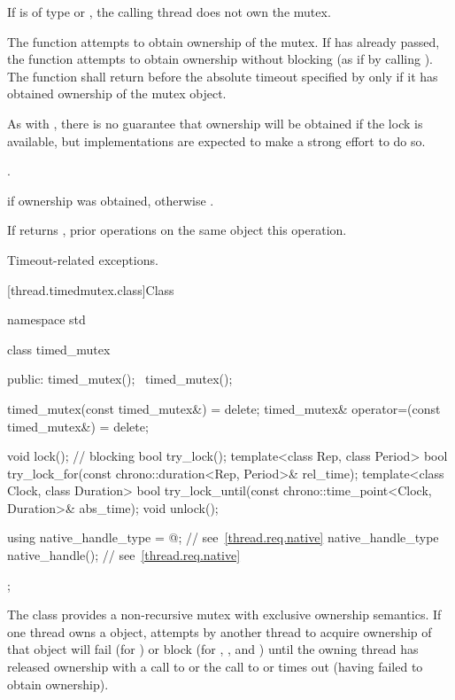 \begin{itemdescr}
\pnum
\requires If  is of type  or
, the calling thread does not own the
mutex.

\pnum
\effects The function attempts to obtain ownership of the mutex. If
 has already passed, the function attempts to obtain ownership
without blocking (as if by calling ). The function shall
return before the absolute timeout specified by
 only if it has obtained ownership of the mutex object.
\begin{note} As with , there is no guarantee that ownership will
be obtained if the lock is available, but implementations are expected to make a
strong effort to do so. \end{note}

\pnum\returntype {}.

\pnum
\returns {} if ownership was obtained, otherwise .

\pnum
\sync If  returns , prior 
operations on the same object 
this operation.

\pnum\throws Timeout-related exceptions.
\end{itemdescr}

[thread.timedmutex.class]{Class }

%
\begin{codeblock}
namespace std {
  class timed_mutex {
  public:
    timed_mutex();
    ~timed_mutex();

    timed_mutex(const timed_mutex&) = delete;
    timed_mutex& operator=(const timed_mutex&) = delete;

    void lock();    // blocking
    bool try_lock();
    template<class Rep, class Period>
      bool try_lock_for(const chrono::duration<Rep, Period>& rel_time);
    template<class Clock, class Duration>
      bool try_lock_until(const chrono::time_point<Clock, Duration>& abs_time);
    void unlock();

    using native_handle_type = @\impdefnc@;          // see~\ref{thread.req.native}
    native_handle_type native_handle();                         // see~\ref{thread.req.native}
  };
}
\end{codeblock}

\pnum
The class  provides a non-recursive mutex with exclusive ownership
semantics. If one thread owns a  object, attempts by another thread
to acquire ownership of that object will fail (for ) or block
(for , , and ) until
the owning thread has released ownership with a call to  or the
call to  or  times out (having
failed to obtain ownership).

